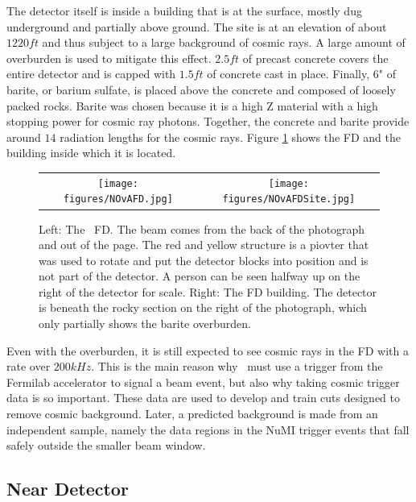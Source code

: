 The detector itself is inside a building that is at the surface, mostly dug underground and partially above ground. The site is at an elevation of about $1220\unit{ft}$ and thus subject to a large background of cosmic rays. A large amount of overburden is used to mitigate this effect. $2.5\unit{ft}$ of precast concrete covers the entire detector and is capped with $1.5\unit{ft}$ of concrete cast in place. Finally, $6$" of barite, or barium sulfate, is placed above the concrete and composed of loosely packed rocks. Barite was chosen because it is a high Z material with a high stopping power for cosmic ray photons. Together, the concrete and barite provide around $14$ radiation lengths for the cosmic rays. Figure \ref{fig:FD} shows the FD and the building inside which it is located.
\begin{figure}[htb]
  \centering
  \begin{tabular}{c c}
    \texttt{[image: figures/NOvAFD.jpg]} &
    \texttt{[image: figures/NOvAFDSite.jpg]} \\
  \end{tabular}
  \caption[The \nova~Far Detector]{Left: The \nova~FD. The beam comes from the back of the photograph and out of the page. The red and yellow structure is a piovter that was used to rotate and put the detector blocks into position and is not part of the detector. A person can be seen halfway up on the right of the detector for scale. Right: The FD building. The detector is beneath the rocky section on the right of the photograph, which only partially shows the barite overburden.}
  \label{fig:FD}
\end{figure}

Even with the overburden, it is still expected to see cosmic rays in the FD with a rate over $200\unit{kHz}$. This is the main reason why \nova~must use a trigger from the Fermilab accelerator to signal a beam event, but also why taking cosmic trigger data is so important. These data are used to develop and train cuts designed to remove cosmic background. Later, a predicted background is made from an independent sample, namely the data regions in the NuMI trigger events that fall safely outside the smaller beam window.

\subsection{Near Detector}

